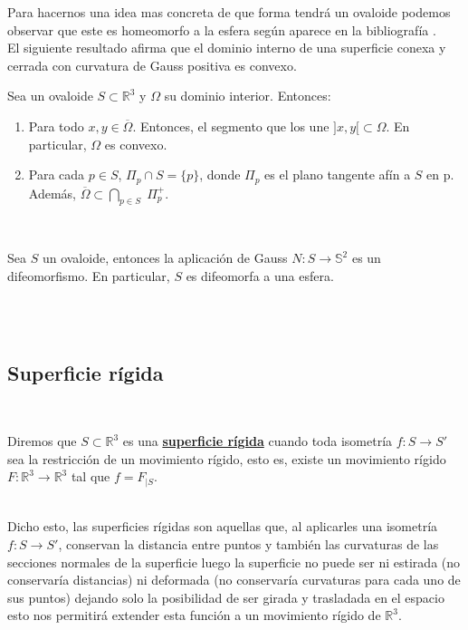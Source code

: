 Para hacernos una idea mas concreta de que forma tendrá un ovaloide podemos observar que este es homeomorfo a la esfera según aparece en la bibliografía \cite{ref1}.
${ }$\\

El siguiente resultado afirma que el dominio interno de una superficie conexa y cerrada con curvatura de Gauss positiva es convexo.
${ }$\\

\begin{teorema} \label{teo:hadamard}
	Sea un ovaloide $S \subset \mathbb{R}^3$ y $\Omega$ su dominio interior. Entonces:
	
	\begin{enumerate}
		\item Para todo $x, y \in \overline{\Omega}$. Entonces, el segmento que los une $]x, y[ \subset \Omega$. En particular, $\Omega$ es convexo.
		\item Para cada $p \in S$, $\Pi_p \cap S = \{p\}$, donde $\Pi_p$ es el plano tangente afín a $S$ en p. Además, $\overline{\Omega} \subset \bigcap_{p \in S} \; \Pi^{+}_{p}$.
	\end{enumerate}
\end{teorema}
${ }$\\

\begin{teorema}[Hadamard]
	Sea $S$ un ovaloide, entonces la aplicación de Gauss $N : S \to \mathbb{S}^2$ es un difeomorfismo. En particular, $S$ es difeomorfa a una esfera.
\end{teorema}
${ }$\\


${ }$\\
\subsection{Superficie rígida}
${ }$\\

\begin{definicion}
	Diremos que $S \subset \mathbb{R}^3$ es una \underline{\textbf{superficie rígida}} cuando toda isometría $f : S \to S'$ sea la restricción de un movimiento rígido, esto es, existe un movimiento rígido $F : \mathbb{R}^3 \to \mathbb{R}^3$ tal que $f = F_{|S}$.
\end{definicion}
${ }$\\

Dicho esto, las superficies rígidas son aquellas que, al aplicarles una isometría $f : S \to S'$, conservan la distancia entre puntos y también las curvaturas de las secciones normales de la superficie luego la superficie no puede ser ni estirada (no conservaría distancias) ni deformada (no conservaría curvaturas para cada uno de sus puntos) dejando solo la posibilidad de ser girada y trasladada en el espacio esto nos permitirá extender esta función a un movimiento rígido de $\mathbb{R}^3$.
${ }$\\




